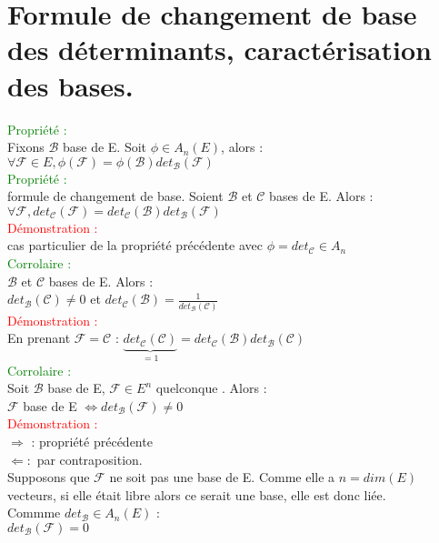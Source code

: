 \documentclass{article}
\begin{document}
	\section{Formule de changement de base des déterminants, caractérisation des bases.}
	\textcolor{green}{Propriété :} \\
	Fixons $\mathcal B$ base de E. Soit $\phi \in A_n(E)$, alors : \\
	$\forall \mathcal F \in E, \phi(\mathcal F)= \phi(\mathcal B)det_{\mathcal B}(\mathcal F)$ \\
	\textcolor{green}{Propriété :} \\
	formule de changement de base. Soient $\mathcal B$ et $\mathcal C$ bases de E. Alors : \\
	$\forall \mathcal F, det_{\mathcal C}(\mathcal F)= det_{\mathcal C}(\mathcal B) det_{\mathcal B}(\mathcal F)$ \\
	\textcolor{red}{Démonstration :} \\
	cas particulier de la propriété précédente avec $\phi= det_{\mathcal C} \in A_n$ \\
	\textcolor{green}{Corrolaire :} \\
	$\mathcal B$ et $\mathcal{C}$ bases de E. Alors : \\
	$det_{\mathcal B}(\mathcal C) \neq 0$ et $det_{\mathcal C}(\mathcal B)= \frac{1}{det_{\mathcal B}(\mathcal C)}$ \\
	\textcolor{red}{Démonstration :} \\
	En prenant $\mathcal F= \mathcal C$ : $\underbrace{det_{\mathcal C}(\mathcal C)}_{=1}=det_{\mathcal C}(\mathcal B)det_{\mathcal B}(\mathcal C)$ \\
	\textcolor{green}{Corrolaire :} \\
	Soit $\mathcal B$ base de E, $\mathcal F \in  E^n$ quelconque . Alors : \\
	$\mathcal F$ base de E $\Longleftrightarrow det_{\mathcal B}(\mathcal F) \neq 0$ \\
	\textcolor{red}{Démonstration :} \\
	$\Rightarrow$ : propriété précédente \\
	$\Leftarrow :$ par contraposition. \\
	Supposons que $\mathcal F$ ne soit pas une base de E. Comme elle a $n=dim(E)$ vecteurs, si elle était libre alors ce serait une base, elle est donc liée. \\
	Commme $det_{\mathcal B} \in A_n(E)$ : \\
	$det_{\mathcal B}(\mathcal F)=0$
\end{document}
